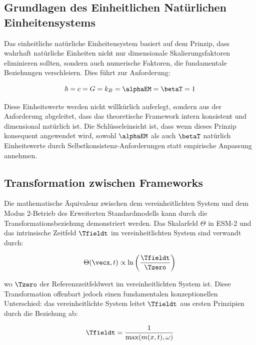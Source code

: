 	\subsection{Grundlagen des Einheitlichen Natürlichen Einheitensystems}
	\label{subsec:unified_foundation}
	
	Das einheitliche natürliche Einheitensystem basiert auf dem Prinzip, dass wahrhaft natürliche Einheiten nicht nur dimensionale Skalierungsfaktoren eliminieren sollten, sondern auch numerische Faktoren, die fundamentale Beziehungen verschleiern. Dies führt zur Anforderung:
	
	\begin{equation}
		\hbar = c = G = k_B = \alphaEM = \betaT = 1
	\end{equation}
	
	Diese Einheitswerte werden nicht willkürlich auferlegt, sondern aus der Anforderung abgeleitet, dass das theoretische Framework intern konsistent und dimensional natürlich ist. Die Schlüsseleinsicht ist, dass wenn dieses Prinzip konsequent angewendet wird, sowohl $\alphaEM$ als auch $\betaT$ natürlich Einheitswerte durch Selbstkonsistenz-Anforderungen statt empirische Anpassung annehmen.
	
	\subsection{Transformation zwischen Frameworks}
	\label{subsec:transformation}
	
	Die mathematische Äquivalenz zwischen dem vereinheitlichten System und dem Modus 2-Betrieb des Erweiterten Standardmodells kann durch die Transformationsbeziehung demonstriert werden. Das Skalarfeld $\Theta$ in ESM-2 und das intrinsische Zeitfeld $\Tfieldt$ im vereinheitlichten System sind verwandt durch:
	
	\begin{equation}
		\Theta(\vecx,t) \propto \ln\left(\frac{\Tfieldt}{\Tzero}\right)
	\end{equation}
	
	wo $\Tzero$ der Referenzzeitfeldwert im vereinheitlichten System ist. Diese Transformation offenbart jedoch einen fundamentalen konzeptionellen Unterschied: das vereinheitlichte System leitet $\Tfieldt$ aus ersten Prinzipien durch die Beziehung ab:
	
	\begin{equation}
		\Tfieldt = \frac{1}{\max(m(x,t), \omega)}
	\end{equation}
	
